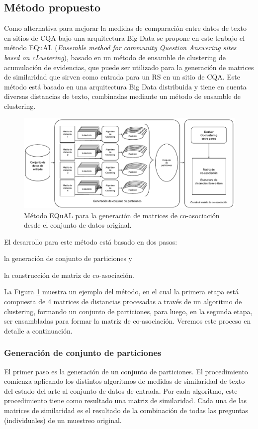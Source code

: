 \subsection{Método propuesto}
Como alternativa para mejorar la medidas de comparación entre datos de texto en sitios de CQA bajo una arquitectura Big Data se propone en este trabajo el método EQuAL (\textit{Ensemble method for community Question Answering sites based on cLustering}), basado en un método de ensamble de clustering de acumulación de evidencias, que puede ser utilizado para la generación de matrices de similaridad que sirven como entrada para un RS en un sitio de CQA. Este método está basado en una arquitectura Big Data distribuida y tiene en cuenta diversas distancias de texto, combinadas mediante un método de ensamble de clustering.

\begin{figure}[h!]
	\centering
	\includegraphics[width=0.9\linewidth]{8_problema_investigacion/imagenes/metodo_equal}
	\caption{Método EQuAL para la generación de matrices de co-asociación desde el conjunto de datos original.}
	\label{fig:metodoequal}
\end{figure}

El desarrollo para este método está basado en dos pasos: \begin{enumerate*} [label=(\roman*)] \item la generación de conjunto de particiones y \item la construcción de matriz de co-asociación. \end{enumerate*} La Figura \ref{fig:metodoequal} muestra un ejemplo del método, en el cual la primera etapa está compuesta de 4 matrices de distancias procesadas a través de un algoritmo de clustering, formando un conjunto de particiones, para luego, en la segunda etapa, ser ensambladas para formar la matriz de co-asociación. Veremos este proceso en detalle a continuación.


\subsubsection{Generación de conjunto de particiones}
El primer paso es la generación de un conjunto de particiones. El procedimiento comienza aplicando los distintos algoritmos de medidas de similaridad de texto del estado del arte al conjunto de datos de entrada. Por cada algoritmo, este procedimiento tiene como resultado una matriz de similaridad. Cada una de las matrices de similaridad es el resultado de la combinación de todas las preguntas (individuales) de un muestreo original.

